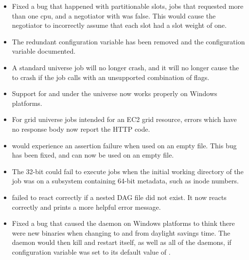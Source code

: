 \begin{itemize}

\item Fixed a bug that happened with partitionable slots, jobs that
requested more than one cpu, and a negotiator with
 was false.  This would
cause the negotiator to incorrectly assume that each slot had
a slot weight of one.

\item The redundant configuration variable  has
been removed and the configuration variable 
documented.

\item A standard universe job will no longer crash, and it will no longer 
cause the  to crash
if the job calls  with an unsupported combination of flags.

\item Support for  and  
under the  universe now works properly on Windows platforms.

\item For grid universe jobs intended for an EC2 grid resource,
errors which have no response body now report the HTTP code.

\item {}  would experience an assertion failure when
used on an empty file.  This bug has been fixed, and  can now be
used on an empty file.

\item The 32-bit  could fail to execute jobs when the initial
working directory of the job was on a subsystem containing 64-bit metadata,
such as inode numbers.

\item {} failed to react correctly if a nested DAG file
did not exist. It now reacts correctly and prints a more
helpful error message.

\item Fixed a bug that caused the  daemon on Windows platforms
to think there were new binaries
when changing to and from daylight savings time.
The  daemon would then kill and restart itself,
as well as all of the daemons,
if configuration variable  was set
to its default value of .


\end{itemize}
